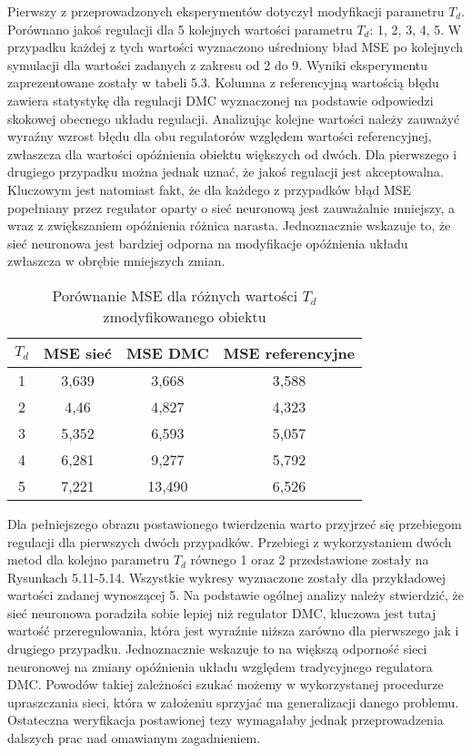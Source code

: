 \par Pierwszy z przeprowadzonych eksperymentów dotyczył modyfikacji parametru \(T_d\). Porównano jakoś regulacji dla 5 kolejnych wartości parametru \(T_d\): 1, 2, 3, 4, 5. W przypadku każdej z tych wartości wyznaczono uśredniony bład MSE po kolejnych symulacji dla wartości zadanych z zakresu od 2 do 9. Wyniki eksperymentu zaprezentowane zostały w tabeli 5.3. Kolumna z referencyjną wartością błędu zawiera statystykę dla regulacji DMC wyznaczonej na podstawie odpowiedzi skokowej obecnego układu regulacji. Analizując kolejne wartości należy zauważyć wyraźny wzrost błędu dla obu regulatorów względem wartości referencyjnej, zwłaszcza dla wartości opóźnienia obiektu większych od dwóch. Dla pierwszego i drugiego przypadku można jednak uznać, że jakoś regulacji jest akceptowalna.  Kluczowym jest natomiast fakt, że dla każdego z przypadków błąd MSE popełniany przez regulator oparty o sieć neuronową jest zauważalnie mniejszy, a wraz z zwiększaniem opóźnienia różnica narasta. Jednoznacznie wskazuje to, że sieć neuronowa jest bardziej odporna na modyfikacje opóźnienia układu zwłaszcza w obrębie mniejszych zmian. 

\begin{table}[!h] \label{tab:tabela3} \centering
\caption{Porównanie MSE dla różnych wartości \(T_d\) zmodyfikowanego obiektu}
\begin{tabular} {| c | c | c | c |} \hline
    \(T_d\) & MSE sieć & MSE DMC & MSE referencyjne \\ \hline\hline
    1 & 3,639 & 3,668 & 3,588 \\ \hline
    2 & 4,46 & 4,827 & 4,323 \\ \hline
    3 & 5,352 & 6,593 & 5,057 \\ \hline
    4 & 6,281 & 9,277 & 5,792 \\ \hline
    5 & 7,221 & 13,490 & 6,526 \\ \hline
\end{tabular}
\end{table}

\par Dla pełniejszego obrazu postawionego twierdzenia warto przyjrzeć się przebiegom regulacji dla pierwszych dwóch przypadków. Przebiegi z wykorzystaniem dwóch metod dla kolejno parametru \(T_d\) równego 1 oraz 2 przedstawione zostały na Rysunkach 5.11-5.14. Wszystkie wykresy wyznaczone zostały dla przykładowej wartości zadanej wynoszącej 5. Na podstawie ogólnej analizy należy stwierdzić, że sieć neuronowa poradziła sobie lepiej niż regulator DMC, kluczowa jest tutaj wartość przeregulowania, która jest wyraźnie niższa zarówno dla pierwszego jak i drugiego przypadku. Jednoznacznie wskazuje to na większą odporność sieci neuronowej na zmiany opóźnienia układu względem tradycyjnego regulatora DMC. Powodów takiej zależności szukać możemy w wykorzystanej procedurze upraszczania sieci, która w założeniu sprzyjać ma generalizacji danego problemu. Ostateczna weryfikacja postawionej tezy wymagałaby jednak przeprowadzenia dalszych prac nad omawianym zagadnieniem. 

